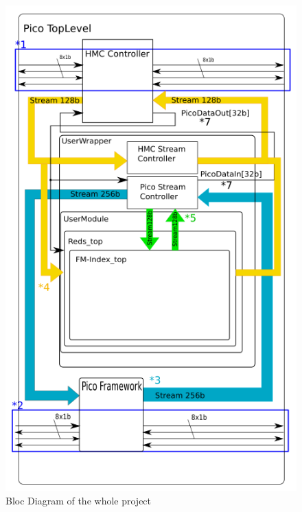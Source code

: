 \begin{minipage}[t]{0.6\textwidth}
\begin{figure}[H]
  \hspace{-15mm}  \includegraphics[scale = 0.6]{Figures/block_diagram.png}
    \caption{Bloc Diagram of the whole project}
    \label{fig:block_diag}
\end{figure}
\end{minipage}
